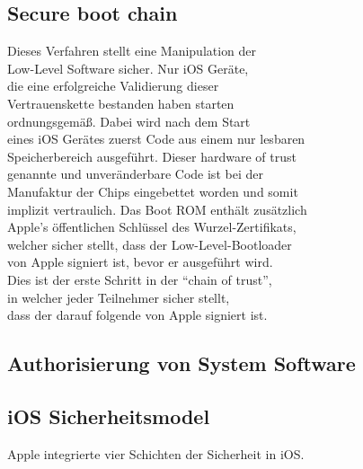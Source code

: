 	\subsection{Secure boot chain}
		Dieses Verfahren stellt eine Manipulation der \\
		Low-Level Software sicher. Nur iOS Geräte, \\
		die eine erfolgreiche Validierung dieser\\ 
		Vertrauenskette bestanden haben	starten\\ 
		ordnungsgemäß. Dabei wird nach dem Start\\
		eines iOS Gerätes zuerst Code aus einem nur lesbaren\\
		Speicherbereich ausgeführt. Dieser hardware of trust\\ 
		genannte und unveränderbare Code ist bei der\\
		Manufaktur der Chips eingebettet worden und somit\\
		implizit vertraulich. Das Boot ROM enthält zusätzlich\\
		Apple's öffentlichen Schlüssel des Wurzel-Zertifikats,\\
		welcher	sicher stellt, dass	der Low-Level-Bootloader\\
		von Apple signiert ist, bevor er ausgeführt wird.\\ 
		Dies ist der erste Schritt in der "`chain of trust"',\\ 
		in welcher jeder Teilnehmer sicher stellt,\\ 
		dass der darauf	folgende von Apple signiert	ist.
		
	    
		
	\subsection{Authorisierung von System Software}
		
	\subsection{iOS Sicherheitsmodel}
		Apple integrierte vier Schichten der Sicherheit in iOS.\\